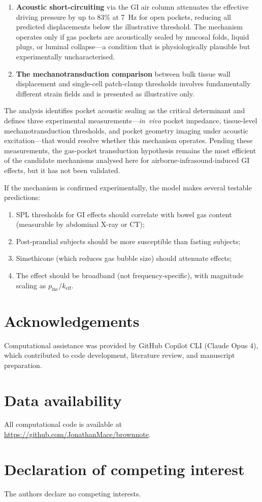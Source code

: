 \documentclass[12pt]{article}
\begin{document}
\begin{enumerate}
  \item \textbf{Acoustic short-circuiting} via the GI air column
        attenuates the effective driving pressure by up to 83\% at
        \SI{7}{\hertz} for open pockets, reducing all predicted
        displacements below the illustrative threshold.  The mechanism
        operates only if gas pockets are acoustically sealed by mucosal
        folds, liquid plugs, or luminal collapse---a condition that is
        physiologically plausible but experimentally uncharacterised.
  \item \textbf{The mechanotransduction comparison} between bulk tissue
        wall displacement and single-cell patch-clamp thresholds involves
        fundamentally different strain fields and is presented as
        illustrative only.
\end{enumerate}

The analysis identifies pocket acoustic sealing as the critical determinant
and defines three experimental measurements---\emph{in~vivo} pocket
impedance, tissue-level mechanotransduction thresholds, and pocket geometry
imaging under acoustic excitation---that would resolve whether this
mechanism operates.  Pending these measurements, the gas-pocket
transduction hypothesis remains the most efficient of the candidate
mechanisms analysed here for airborne-infrasound-induced GI effects, but it has not been
validated.

If the mechanism is confirmed experimentally, the model makes several
testable predictions:
\begin{enumerate}
  \item SPL thresholds for GI effects should correlate with bowel gas
        content (measurable by abdominal X-ray or CT);
  \item Post-prandial subjects should be more susceptible than fasting
        subjects;
  \item Simethicone (which reduces gas bubble size) should attenuate
        effects;
  \item The effect should be broadband (not frequency-specific), with
        magnitude scaling as $p_\text{inc}/k_\text{eff}$.
\end{enumerate}



\section*{Acknowledgements}
Computational assistance was provided by GitHub Copilot CLI (Claude Opus 4),
which contributed to code development, literature review, and manuscript
preparation.

\section*{Data availability}
All computational code is available at \url{https://github.com/JonathanMace/brownnote}.

\section*{Declaration of competing interest}
The authors declare no competing interests.




\end{document}
